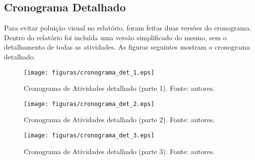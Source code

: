 \begin{apendicesenv}
\partapendices

\chapter{Cronograma Detalhado}
\label{schedule_ap}

Para evitar poluição visual no relatório, foram feitas duas versões do cronograma.
Dentro do relatório foi incluída uma versão simplificado do mesmo, sem o detalhamento de todas as atividades.
As figuras seguintes mostram o cronograma detalhado.

\begin{figure}[!htbp]
  \centering
  \texttt{[image: figuras/cronograma\_det\_1.eps]}
  \caption{Cronograma de Atividades detalhado (parte 1). Fonte: autores.}
  \label{fig:cron_d1}
\end{figure}

\vfill
\pagebreak

\begin{figure}[!htbp]
  \centering
  \texttt{[image: figuras/cronograma\_det\_2.eps]}
  \caption{Cronograma de Atividades detalhado (parte 2). Fonte: autores.}
  \label{fig:cron_d2}
\end{figure}

\vfill
\pagebreak

\begin{figure}[!htbp]
  \centering
  \texttt{[image: figuras/cronograma\_det\_3.eps]}
  \caption{Cronograma de Atividades detalhado (parte 3). Fonte: autores.}
  \label{fig:cron_d3}
\end{figure}

\end{apendicesenv}

